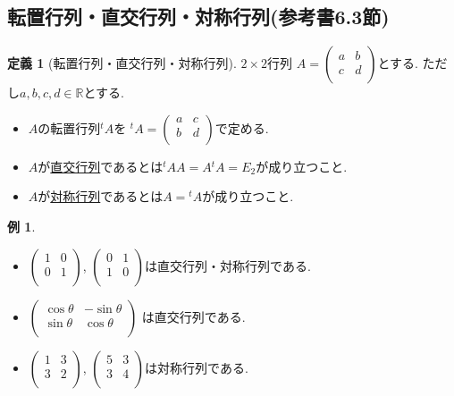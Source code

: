 \documentclass[dvipdfmx,a4paper,11pt]{article}
\newcommand{\R}{\mathbb{R}}
\theoremstyle{definition}
\newtheorem{dfn}[thm]{定義}
\newtheorem{exa}[thm]{例}
\begin{document}
 

 
 \subsection{転置行列・直交行列・対称行列(参考書6.3節)}
 
 \begin{tcolorbox}[
    colback = white,
    colframe = green!35!black,
    fonttitle = \bfseries,
    breakable = true]
    \begin{dfn}[転置行列・直交行列・対称行列]
$2 \times 2$行列
$
A=\begin{pmatrix}
a& b \\
c& d \\
\end{pmatrix}
$とする. ただし$a,b,c,d \in \R$とする.
\begin{itemize}
\setlength{\parskip}{0cm}
 \setlength{\itemsep}{0pt} 
\item $A$の転置行列${}^t A$を
${}^t A =\begin{pmatrix}
a& c \\
b& d \\
\end{pmatrix}
$で定める.
\item $A$が\underline{直交行列}であるとは${}^t A A= A {}^t A = E_2$が成り立つこと.
\item $A$が\underline{対称行列}であるとは$ A= {}^t A$が成り立つこと.
\end{itemize}
\end{dfn}
 \end{tcolorbox}
 
 \begin{exa}
 \begin{itemize}
\setlength{\parskip}{0cm}
 \setlength{\itemsep}{0pt} 
\item  $\begin{pmatrix}
1& 0 \\
0& 1 \\
\end{pmatrix}
$, 
 $\begin{pmatrix}
0& 1\\
1& 0 \\
\end{pmatrix}
$は直交行列・対称行列である.

\item $
\begin{pmatrix}
\cos \theta & -\sin \theta\\
\sin \theta& \cos \theta  \\
\end{pmatrix}
$
は直交行列である.

\item  $\begin{pmatrix}
1& 3 \\
3& 2 \\
\end{pmatrix}
$, 
 $\begin{pmatrix}
5& 3\\
3& 4 \\
\end{pmatrix}
$は対称行列である.
\end{itemize}
 \end{exa}
 
\end{document}
